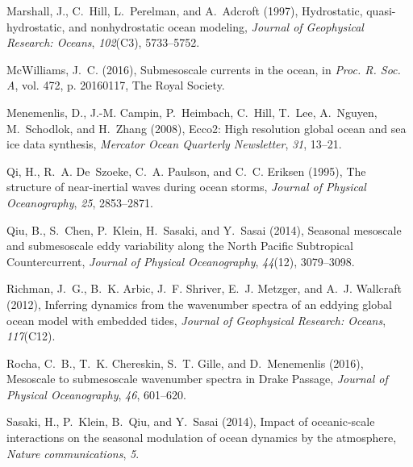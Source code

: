 \documentclass[grl]{agutex2015}
\begin{document}
\begin{article}
\begin{thebibliography}{18}
  Marshall, J., C.~Hill, L.~Perelman, and A.~Adcroft (1997), Hydrostatic,
    quasi-hydrostatic, and nonhydrostatic ocean modeling, \textit{Journal of
    Geophysical Research: Oceans}, \textit{102}(C3), 5733--5752.

  McWilliams, J.~C. (2016), {Submesoscale currents in the ocean}, in
    \textit{Proc. R. Soc. A}, vol. 472, p. 20160117, The Royal Society.

  Menemenlis, D., J.-M. Campin, P.~Heimbach, C.~Hill, T.~Lee, A.~Nguyen,
    M.~Schodlok, and H.~Zhang (2008), Ecco2: High resolution global ocean and sea
    ice data synthesis, \textit{Mercator Ocean Quarterly Newsletter},
    \textit{31}, 13--21.

Qi, H., R.~A. De~Szoeke, C.~A. Paulson, and C.~C. Eriksen (1995), {The
  structure of near-inertial waves during ocean storms}, \textit{Journal of
  Physical Oceanography}, \textit{25}, 2853--2871.

Qiu, B., S.~Chen, P.~Klein, H.~Sasaki, and Y.~Sasai (2014), {Seasonal mesoscale
  and submesoscale eddy variability along the North Pacific Subtropical
  Countercurrent}, \textit{Journal of Physical Oceanography}, \textit{44}(12),
  3079--3098.

Richman, J.~G., B.~K. Arbic, J.~F. Shriver, E.~J. Metzger, and A.~J. Wallcraft
  (2012), {Inferring dynamics from the wavenumber spectra of an eddying global
  ocean model with embedded tides}, \textit{Journal of Geophysical Research:
  Oceans}, \textit{117}(C12).

Rocha, C.~B., T.~K. Chereskin, S.~T. Gille, and D.~Menemenlis (2016),
  {Mesoscale to submesoscale wavenumber spectra in Drake Passage},
  \textit{Journal of Physical Oceanography}, \textit{46}, 601--620.

Sasaki, H., P.~Klein, B.~Qiu, and Y.~Sasai (2014), {Impact of oceanic-scale
  interactions on the seasonal modulation of ocean dynamics by the atmosphere},
  \textit{Nature communications}, \textit{5}.


\end{thebibliography}
\end{article}
\end{document}
